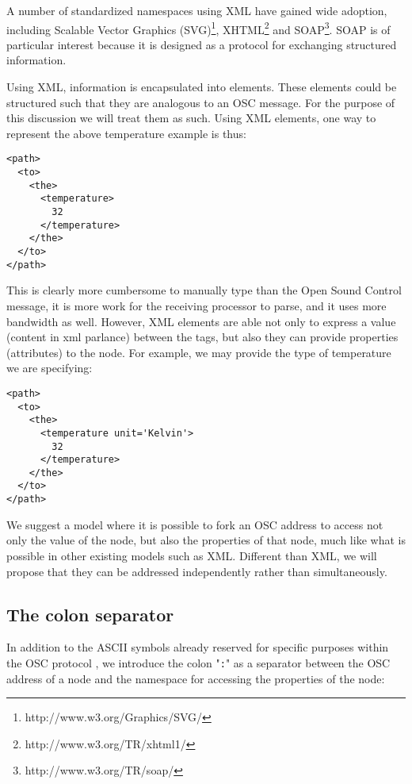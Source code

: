 \documentclass{sig-alternate}
\begin{document}
A number of standardized namespaces using XML have gained wide adoption, including Scalable Vector Graphics (SVG)\footnote{http://www.w3.org/Graphics/SVG/}, XHTML\footnote{http://www.w3.org/TR/xhtml1/} and SOAP\footnote{http://www.w3.org/TR/soap/}.  SOAP is of particular interest because it is designed as a protocol for exchanging structured information.

Using XML, information is encapsulated into elements.  These elements could be structured such that they are analogous to an OSC message. For the purpose of this discussion we will treat them as such.  Using XML elements, one way to represent the above temperature example is thus:

\begin{lstlisting}
<path>
  <to>
    <the>
      <temperature> 
        32
      </temperature>
    </the>
  </to>
</path>
\end{lstlisting}

This is clearly more cumbersome to manually type than the Open Sound Control message, it is more work for the receiving processor to parse, and it uses more bandwidth as well. However, XML elements are able not only to express a value (content in xml parlance) between the tags, but also they can provide properties (attributes) to the node. For example, we may provide the type of temperature we are specifying:

\begin{lstlisting}
<path>
  <to>
    <the>
      <temperature unit='Kelvin'>
        32
      </temperature>
    </the>
  </to>
</path>
\end{lstlisting}

We suggest a model where it is possible to fork an OSC address to access not only the value of the node, but also the properties of that node, much like what is possible in other existing models such as XML.  Different than XML, we will propose that they can be addressed independently rather than simultaneously.


\subsection{The colon separator} %
\label{sub:the_colon_separator}

In addition to the ASCII symbols already reserved for specific purposes within the OSC protocol \cite{Wright:1997}, we introduce the colon "\texttt{:}" as a separator between the OSC address of a node and the namespace for accessing the properties of the node:
\end{document}
